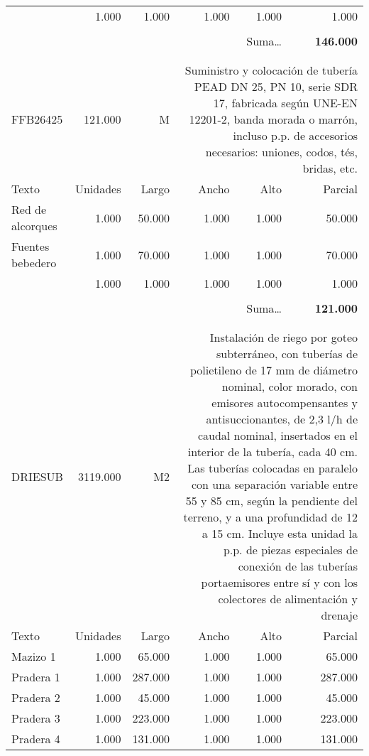 \documentclass{book}%
\begin{document}
\begin{longtable}{lrrrrr}
\multicolumn{1}{p{3.5cm}}{}&1.000&1.000&1.000&1.000&1.000\\%
&&&&&\\%
\multicolumn{5}{r}{Suma\ldots}&\textbf{146.000}\\%
\hline%
&&&&&\\%
&&&&&\\%
FFB26425&121.000& M&\multicolumn{3}{p{6cm}}{\scriptsize Suministro y colocación de tubería PEAD DN 25, PN 10, serie SDR 17, fabricada según UNE-EN 12201-2, banda morada o marrón,  incluso  p.p. de accesorios necesarios: uniones, codos, tés, bridas, etc.\normalsize}\\%
Texto&Unidades&Largo&Ancho&Alto&Parcial\\%
\hline%
\multicolumn{1}{p{3.5cm}}{Red de alcorques}&1.000&50.000&1.000&1.000&50.000\\%
\multicolumn{1}{p{3.5cm}}{Fuentes  bebedero}&1.000&70.000&1.000&1.000&70.000\\%
\multicolumn{1}{p{3.5cm}}{}&1.000&1.000&1.000&1.000&1.000\\%
&&&&&\\%
\multicolumn{5}{r}{Suma\ldots}&\textbf{121.000}\\%
\hline%
&&&&&\\%
&&&&&\\%
DRIESUB&3119.000& M2&\multicolumn{3}{p{6cm}}{\scriptsize Instalación de riego por goteo subterráneo, con tuberías de polietileno de 17 mm de diámetro nominal, color morado, con emisores autocompensantes y antisuccionantes, de 2,3 l/h de caudal nominal, insertados en el interior de la tubería, cada 40 cm. Las tuberías colocadas en paralelo con una separación variable entre 55 y 85 cm, según  la  pendiente del terreno, y a una profundidad de 12 a 15 cm. Incluye esta unidad la p.p. de piezas especiales de conexión de las tuberías portaemisores entre sí y con los colectores de alimentación  y drenaje\normalsize}\\%
Texto&Unidades&Largo&Ancho&Alto&Parcial\\%
\hline%
\multicolumn{1}{p{3.5cm}}{Mazizo 1}&1.000&65.000&1.000&1.000&65.000\\%
\multicolumn{1}{p{3.5cm}}{Pradera 1}&1.000&287.000&1.000&1.000&287.000\\%
\multicolumn{1}{p{3.5cm}}{Pradera 2}&1.000&45.000&1.000&1.000&45.000\\%
\multicolumn{1}{p{3.5cm}}{Pradera 3}&1.000&223.000&1.000&1.000&223.000\\%
\multicolumn{1}{p{3.5cm}}{Pradera 4}&1.000&131.000&1.000&1.000&131.000\\%

\end{longtable}
\end{document}
